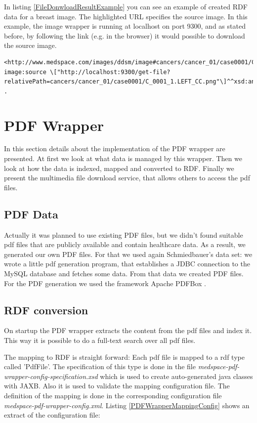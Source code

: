 In listing \ref{FileDonwloadResultExample} you can see an example of created RDF data for a breast image. The highlighted URL specifies the source image. In this example, the image wrapper is running at localhost on port 9300, and as stated before, by following the link (e.g. in the browser) it would possible to download the source image.

\begin{lstlisting}[style=RdfCodeStyle, caption=image RDF conversion example, label=FileDonwloadResultExample]
<http://www.medspace.com/images/ddsm/image#cancers/cancer_01/case0001/C_0001_1.LEFT_CC.png>
image:source \["http://localhost:9300/get-file?relativePath=cancers/cancer_01/case0001/C_0001_1.LEFT_CC.png"\]^^xsd:anyURI .
\end{lstlisting}



\section{PDF Wrapper}
In this section details about the implementation of the PDF wrapper are presented.
At first we look at what data is managed by this wrapper. Then we look at how the data is indexed, mapped and converted to RDF. Finally we present the multimedia file download service, that allows others to access the pdf files.

\subsection{PDF Data}

Actually it was planned to use existing PDF files, but we didn't found suitable pdf files that are publicly available and contain healthcare data. As a result, we generated our own PDF files. For that we used again Schmiedbauer's data set: we wrote a little pdf generation program, that establishes a JDBC connection to the MySQL database and fetches some data. From that data we created PDF files. For the PDF generation we used the framework Apache PDFBox \cite{PDFBox}.  

\subsection{RDF conversion}

On startup the PDF wrapper extracts the content from the pdf files and index it. This way it is possible to do a full-text search over all pdf files. 

The mapping to RDF is straight forward: Each pdf file is mapped to a rdf type called 'PdfFile'. The specification of this type is done in the file \emph{medspace-pdf-wrapper-config-specification.xsd} which is used to create auto-generated java classes with JAXB. Also it is used to validate the mapping configuration file. The definition of the mapping is done in the corresponding configuration file \emph{medspace-pdf-wrapper-config.xml}. Listing \ref{PDFWrapperMappingConfig} shows an extract of the configuration file:

